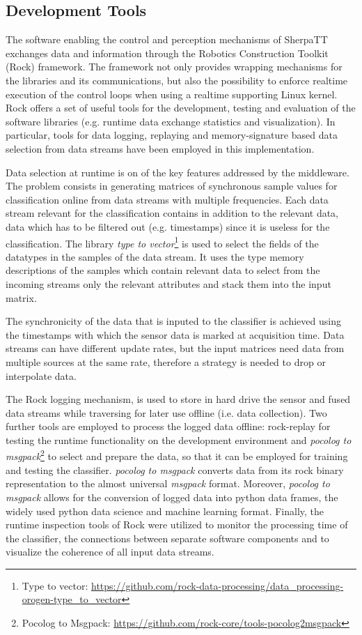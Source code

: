 \documentclass{article}
\begin{document}
\subsection{Development Tools}

The software enabling the control and perception mechanisms of SherpaTT exchanges data and information through the Robotics Construction Toolkit (Rock) framework. 
The framework not only provides wrapping mechanisms for the libraries and its communications, but also the possibility to enforce realtime execution of the control loops when using a realtime supporting Linux kernel. 
Rock offers a set of useful tools for the development, testing and evaluation of the software libraries (e.g. runtime data exchange statistics and visualization). 
In particular, tools for data logging, replaying and memory-signature based data selection from data streams have been employed in this implementation. 

Data selection at runtime is on of the key features addressed by the middleware. 
The problem consists in generating matrices of synchronous sample values for classification online from data streams with multiple frequencies.
Each data stream relevant for the classification contains in addition to the relevant data, data which has to be filtered out (e.g. timestamps) since it is useless for the classification.
The library \emph{type to vector}\footnote{Type to vector: \url{https://github.com/rock-data-processing/data_processing-orogen-type_to_vector}} is used to select the fields of the datatypes in the samples of the data stream. 
It uses the type memory descriptions of the samples which contain relevant data to select from the incoming streams only the relevant attributes and stack them into the input matrix. 

The synchronicity of the data that is inputed to the classifier is achieved using the timestamps with which the sensor data is marked at acquisition time.
Data streams can have different update rates, but the input matrices need data from multiple sources at the same rate, therefore a strategy is needed to drop or interpolate data. 

The Rock logging mechanism, is used to store in hard drive the sensor and fused data streams while traversing for later use offline (i.e. data collection). 
Two further tools are employed to process the logged data offline: rock-replay for testing the runtime functionality on the development environment and \emph{pocolog to msgpack}\footnote{Pocolog to Msgpack: \url{https://github.com/rock-core/tools-pocolog2msgpack}} to select and prepare the data, so that it can be employed for training and testing the classifier.
\emph{pocolog to msgpack} converts data from its rock binary representation to the almost universal \emph{msgpack} format.
Moreover, \emph{pocolog to msgpack} allows for the conversion of logged data into python data frames, the widely used python data science and machine learning format. 
Finally, the runtime inspection tools of Rock were utilized to monitor the processing time of the classifier, the connections between separate software components and to visualize the coherence of all input data streams. 
\end{document}
